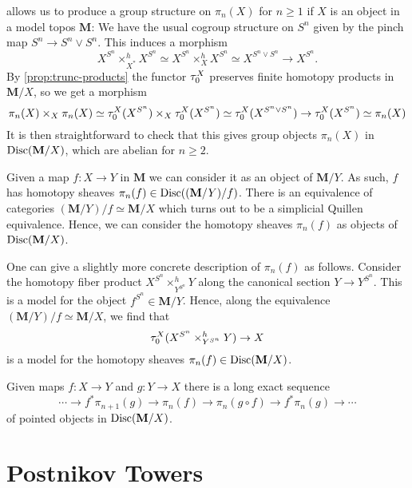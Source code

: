  allows us to produce a group structure on \(\pi_{n}(X)\) for \(n\geq 1\) if \(X\) is an object in a model topos \(\mathbf M\): We have the usual cogroup structure on \(S^{n}\) given by the pinch map \(S^{n}\to S^{n}\vee S^{n}\). This induces a morphism
\[X^{S^{n}}\times^{h}_{X^{*}} X^{S^{n}} \simeq X^{S^{n}}\times^{h}_{X} X^{S^{n}} \simeq  X^{S^{n}\vee S^{n}} \to X^{S^{n}}.\]
By \autoref{prop:trunc-products} the functor \(\tau_{0}^{X}\) preserves finite homotopy products in \(\mathbf M/X\), so we get a morphism
\[\pi_{n}(X)\times_{X}\pi_{n}(X)\simeq \tau_{0}^{X}(X^{S^{n}})\times_{X}\tau_{0}^{X}(X^{S^{n}})\simeq \tau_{0}^{X}(X^{S^{n}\vee S^{n}}) \to \tau_{0}^{X}(X^{S^{n}}) \simeq \pi_{n}(X)\]
It is then straightforward to check that this gives group objects \(\pi_{n}(X)\) in \(\operatorname{\textnormal{Disc}}(\mathbf M/X)\), which are abelian for \(n\geq 2\).

Given a map \(f\colon X\to Y\) in \(\mathbf M\) we can consider it as an object of \(\mathbf M/Y\). As such, \(f\) has homotopy sheaves \(\pi_{n}(f)\in\operatorname{\textnormal{Disc}}((\mathbf M/Y)/f)\). There is an equivalence of categories \((\mathbf M/Y)/f\simeq \mathbf M/X\) which turns out to be a simplicial Quillen equivalence. Hence, we can consider the homotopy sheaves \(\pi_{n}(f)\) as objects of \(\operatorname{\textnormal{Disc}}(\mathbf M/X)\).

One can give a slightly more concrete description of \(\pi_{n}(f)\) as follows. Consider the homotopy fiber product \(X^{S^{n}}\times^{h}_{Y^{S^{n}}} Y\) along the canonical section \(Y\to Y^{S^{n}}\). This is a model for the object \(f^{S^{n}}\in \mathbf M/Y\). Hence, along the equivalence \((\mathbf M/Y)/f\simeq \mathbf M/X\), we find that
\[\tau_{0}^{X}(X^{S^{n}}\times^{h}_{Y^{S^{n}}} Y)\to X\]
is a model for the homotopy sheaves \(\pi_{n}(f)\in\operatorname{\textnormal{Disc}}(\mathbf M/X)\).

\begin{proposition}
  Given maps \(f\colon X\to Y\) and \(g\colon Y\to X\) there is a long exact sequence
  \[
  \cdots \to f^{*}\pi_{n+1}(g) \to \pi_{n}(f) \to \pi_{n}(g\circ f) \to f^{*}\pi_{n}(g) \to \cdots
  \]
  of pointed objects in \(\operatorname{\textnormal{Disc}}(\mathbf M/X)\).
\end{proposition}

\section{Postnikov Towers}

